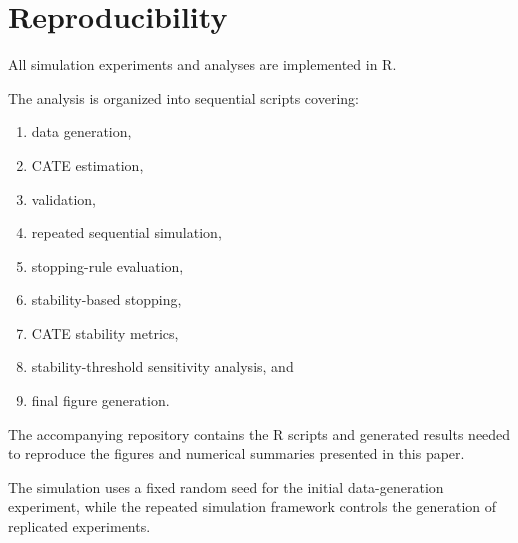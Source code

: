 \documentclass[11pt,a4paper]{article}
\begin{document}

\appendix

\section{Reproducibility}

All simulation experiments and analyses are implemented in R.

The analysis is organized into sequential scripts covering:

\begin{enumerate}
    \item data generation,
    \item CATE estimation,
    \item validation,
    \item repeated sequential simulation,
    \item stopping-rule evaluation,
    \item stability-based stopping,
    \item CATE stability metrics,
    \item stability-threshold sensitivity analysis, and
    \item final figure generation.
\end{enumerate}

The accompanying repository contains the R scripts and generated results
needed to reproduce the figures and numerical summaries presented in this
paper.

The simulation uses a fixed random seed for the initial data-generation
experiment, while the repeated simulation framework controls the generation
of replicated experiments.
\end{document}
